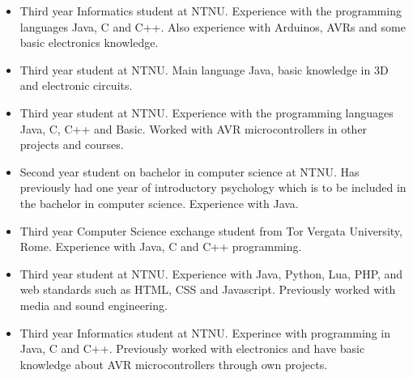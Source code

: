 \begin{itemize}
\item{\anders}\newline
Third year Informatics student at NTNU. Experience with the programming languages Java,
C and C++. Also experience with Arduinos, AVRs and some basic electronics knowledge.

\item{\henrik}\newline
Third year student at NTNU. Main language Java, basic knowledge in 3D and electronic circuits.

\item{\johan}\newline
Third year student at NTNU. Experience with the programming languages Java, C, C++  and
Basic. Worked with AVR microcontrollers in other projects and courses.

\item{\asbjorn}\newline
Second year student on bachelor in computer science at NTNU. Has previously had one year of
introductory psychology which is to be included in the bachelor in computer science.
Experience with Java.

\item{\emanuele}\newline
Third year Computer Science exchange student from Tor Vergata University, Rome.
Experience with Java, C and C++ programming.

\item{\jonas}\newline
Third year student at NTNU. Experience with Java, Python, Lua, PHP, and web standards such as HTML,
CSS and Javascript. Previously worked with media and sound engineering.

\item{\bjornar}\newline
Third year Informatics student at NTNU. Experince with programming in Java, C and C++.
Previously worked with electronics and have basic knowledge about AVR microcontrollers through
own projects.
\end{itemize}
